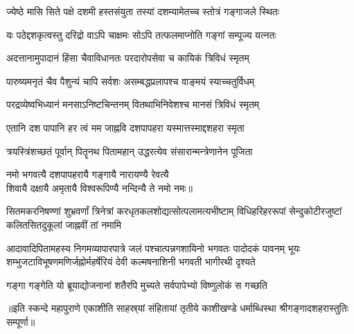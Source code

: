 \twolineshloka
{ज्येष्ठे मासि सिते पक्षे दशमी हस्तसंयुता}%
{तस्यां दशम्यामेतच्च स्तोत्रं गङ्गाजले स्थितः}

\twolineshloka
{यः पठेद्दशकृत्वस्तु दरिद्रो वाऽपि चाक्षमः}%
{सोऽपि तत्फलमाप्नोति गङ्गां सम्पूज्य यत्नतः}

\twolineshloka
{अदत्तानामुपादानं हिंसा चैवाविधानतः}%
{परदारोपसेवा च कायिकं त्रिविधं स्मृतम्}

\twolineshloka
{पारुष्यमनृतं चैव पैशुन्यं चापि सर्वशः}%
{असम्बद्धप्रलापश्च वाङ्मयं स्याच्चतुर्विधम्}

\twolineshloka
{परद्रव्येष्वभिध्यानं मनसाऽनिष्टचिन्तनम्}%
{वितथाभिनिवेशश्च मानसं त्रिविधं स्मृतम्}

\twolineshloka
{एतानि दश पापानि हर त्वं मम जाह्नवि}%
{दशपापहरा यस्मात्तस्माद्दशहरा स्मृता}

\twolineshloka  
{त्रयस्त्रिंशच्छतं पूर्वान् पितॄनथ पितामहान्}%
{उद्धरत्येव संसारान्मन्त्रेणानेन पूजिता}%


{नमो भगवत्यै दशपापहरायै गङ्गायै नारायण्यै रेवत्यै}\\
{शिवायै दक्षायै अमृतायै विश्वरूपिण्यै नन्दिन्यै ते नमो नमः॥}%

\fourlineindentedshloka
{सितमकरनिषण्णां शुभ्रवर्णां त्रिनेत्रां}
{करधृतकलशोद्यत्सोत्पलामत्यभीष्टाम्}%
{विधिहरिहररूपां सेन्दुकोटीरजुष्टां}
{कलितसितदुकूलां जाह्नवीं तां नमामि}%

\fourlineindentedshloka
{आदावादिपितामहस्य निगमव्यापारपात्रे जलं}
        {पश्चात्पन्नगशायिनो भगवतः पादोदकं पावनम्} 
{भूयः शम्भुजटाविभूषणमणिर्जह्नोर्महर्षेरियं}
        {देवी कल्मषनाशिनी भगवती भागीरथी दृश्यते}  %

\twolineshloka  
{गङ्गा गङ्गेति यो ब्रूयाद्योजनानां शतैरपि}
{मुच्यते सर्वपापेभ्यो विष्णुलोकं स गच्छति}%

॥इति स्कन्दे महापुराणे एकाशीति साहस्र्यां संहितायां तृतीये काशीखण्डे
धर्माब्धिस्था श्रीगङ्गादशहरास्तुतिः सम्पूर्णा॥